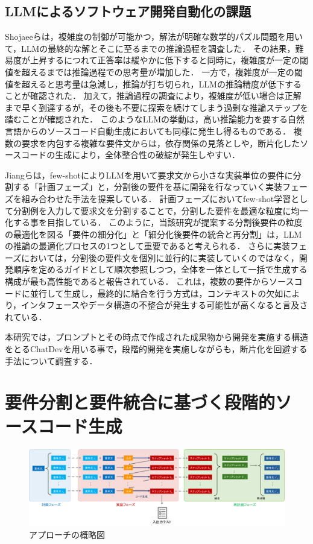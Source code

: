 \documentclass[submit,techrep,noauthor]{ipsj}
\begin{document}
\subsection{LLMによるソフトウェア開発自動化の課題}
Shojaeeら\cite{IllusionApple}は，複雑度の制御が可能かつ，解法が明確な数学的パズル問題を用いて，LLMの最終的な解とそこに至るまでの推論過程を調査した．
その結果，難易度が上昇するにつれて正答率は緩やかに低下すると同時に，複雑度が一定の閾値を超えるまでは推論過程での思考量が増加した．
一方で，複雑度が一定の閾値を超えると思考量は急減し，推論が打ち切られ，LLMの推論精度が低下することが確認された．
加えて，推論過程の調査により，複雑度が低い場合は正解まで早く到達するが，その後も不要に探索を続けてしまう過剰な推論ステップを踏むことが確認された．
このようなLLMの挙動は，高い推論能力を要する自然言語からのソースコード自動生成においても同様に発生し得るものである．
複数の要求を内包する複雑な要件文からは，依存関係の見落としや，断片化したソースコードの生成により，全体整合性の破綻が発生しやすい．

Jiangら\cite{tosem}は，few-shotによりLLMを用いて要求文から小さな実装単位の要件に分割する「計画フェーズ」と，分割後の要件を基に開発を行なっていく実装フェーズを組み合わせた手法を提案している．
計画フェーズにおいてfew-shot学習として分割例を入力して要求文を分割することで，分割した要件を最適な粒度に均一化する事を目指している．
このように，当該研究が提案する分割後要件の粒度の最適化を図る「要件の細分化」と「細分化後要件の統合と再分割」は，LLMの推論の最適化プロセスの1つとして重要であると考えられる．
さらに実装フェーズにおいては，分割後の要件文を個別に並行的に実装していくのではなく，開発順序を定めるガイドとして順次参照しつつ，全体を一体として一括で生成する構成が最も高性能であると報告されている．
これは，複数の要件からソースコードに並行して生成し，最終的に結合を行う方式は，コンテキストの欠如により，インタフェースやデータ構造の不整合が発生する可能性が高くなると言及されている．

本研究では，プロンプトとその時点で作成された成果物から開発を実施する構造をとるChatDevを用いる事で，段階的開発を実施しながらも，断片化を回避する手法について調査する．


\section{要件分割と要件統合に基づく段階的ソースコード生成}
\label{sec:method}

\begin{figure}[t]
    \centering
    \includegraphics[width=1.0\linewidth]{./Toyoshima_fig/approach_abst_v3.pdf}
    \caption{アプローチの概略図}
    \label{approach_abst}
\end{figure}
\end{document}
